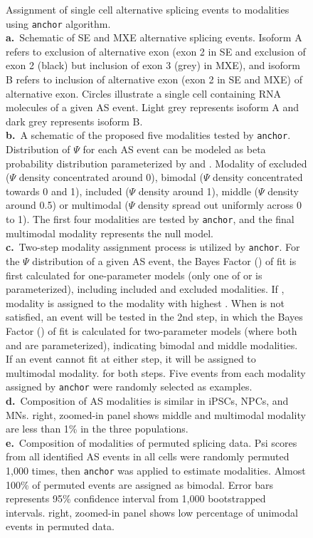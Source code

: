 \clearpage
\thispagestyle{facingcaption}
\begin{figure}[h]
\captionsetup{labelformat=prev-page}
\caption[Assignment of single cell alternative splicing events to modalities using \texttt{anchor} algorithm.]{
Assignment of single cell alternative splicing events to modalities using \texttt{anchor} algorithm.\\
\textbf{a.}~Schematic of SE and MXE alternative splicing events. Isoform A refers to exclusion of alternative exon (exon 2 in SE and exclusion of exon 2 (black) but inclusion of exon 3 (grey) in MXE), and isoform B refers to inclusion of alternative exon (exon 2 in SE and MXE) of alternative exon. Circles illustrate a single cell containing RNA molecules of a given AS event. Light grey represents isoform A and dark grey represents isoform B. \\
\textbf{b.}~A schematic of the proposed five modalities tested by \texttt{anchor}. Distribution of $\Psi$ for each AS event can be modeled as beta probability distribution parameterized by  and . Modality of excluded ($\Psi$ density concentrated around 0), bimodal ($\Psi$ density concentrated towards 0 and 1), included ($\Psi$ density around 1), middle ($\Psi$ density around 0.5) or multimodal ($\Psi$ density spread out uniformly across 0 to 1). The first four modalities are tested by \texttt{anchor}, and the final multimodal modality represents the null model. \\
\textbf{c.}~Two-step modality assignment process is utilized by \texttt{anchor}. For the $\Psi$ distribution of a given AS event, the Bayes Factor () of fit is first calculated for one-parameter models (only one of  or is parameterized), including included and excluded modalities. If , modality is assigned to the modality with highest . When is not satisfied, an event will be tested in the 2nd step, in which the Bayes Factor () of fit is calculated for two-parameter models (where both  and are parameterized), indicating bimodal and middle modalities. If an event cannot fit at either step, it will be assigned to multimodal modality.  for both steps. Five events from each modality assigned by \texttt{anchor} were randomly selected as examples.
\textbf{d.}~Composition of AS modalities is similar in iPSCs, NPCs, and MNs. right, zoomed-in panel shows middle and multimodal modality are less than 1\% in the three populations.\\
\textbf{e.}~Composition of modalities of permuted splicing data. Psi scores from all identified AS events in all cells were randomly permuted 1,000 times, then \texttt{anchor} was applied to estimate modalities. Almost 100\% of permuted events are assigned as bimodal. Error bars represents 95\% confidence interval from 1,000 bootstrapped intervals. right, zoomed-in panel shows low percentage of unimodal events in permuted data.
}
\label{fig:anchor_overview}
\end{figure}
